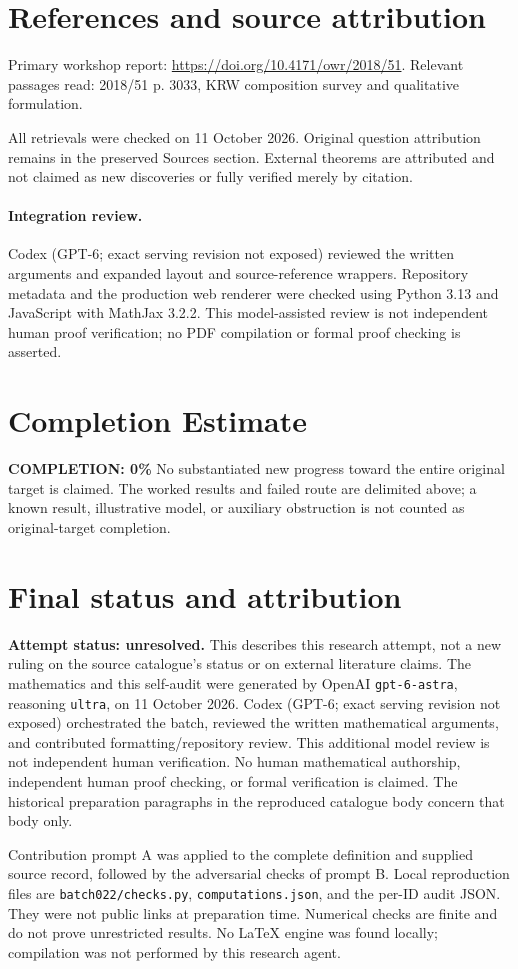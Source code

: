 \documentclass[11pt]{article}
\begin{document}
\section{References and source attribution}
Primary workshop report: \url{https://doi.org/10.4171/owr/2018/51}. Relevant passages read: 2018/51 p. 3033, KRW composition survey and qualitative formulation.

All retrievals were checked on 11 October 2026. Original question attribution remains in the preserved Sources section. External theorems are attributed and not claimed as new discoveries or fully verified merely by citation.


\paragraph{Integration review.} Codex (GPT-6; exact serving revision not exposed) reviewed the written arguments and expanded layout and source-reference wrappers. Repository metadata and the production web renderer were checked using Python 3.13 and JavaScript with MathJax 3.2.2. This model-assisted review is not independent human proof verification; no PDF compilation or formal proof checking is asserted.

\section{Completion Estimate}
\noindent\textbf{COMPLETION: 0\%}
No substantiated new progress toward the entire original target is claimed. The worked results and failed route are delimited above; a known result, illustrative model, or auxiliary obstruction is not counted as original-target completion.

\section{Final status and attribution}
\textbf{Attempt status: unresolved.} This describes this research attempt, not a new ruling on the source catalogue's status or on external literature claims.
The mathematics and this self-audit were generated by OpenAI \texttt{gpt-6-astra}, reasoning \texttt{ultra}, on 11 October 2026. Codex (GPT-6; exact serving revision not exposed) orchestrated the batch, reviewed the written mathematical arguments, and contributed formatting/repository review. This additional model review is not independent human verification. No human mathematical authorship, independent human proof checking, or formal verification is claimed. The historical preparation paragraphs in the reproduced catalogue body concern that body only.

Contribution prompt A was applied to the complete definition and supplied source record, followed by the adversarial checks of prompt B. Local reproduction files are \texttt{batch022/checks.py}, \texttt{computations.json}, and the per-ID audit JSON. They were not public links at preparation time. Numerical checks are finite and do not prove unrestricted results. No LaTeX engine was found locally; compilation was not performed by this research agent.
\end{document}
